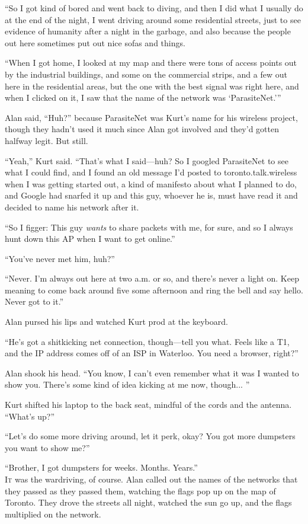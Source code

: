 ``So I got kind of bored and went back to diving, and then I did what
I usually do at the end of the night, I went driving around some
residential streets, just to see evidence of humanity after a night in
the garbage, and also because the people out here sometimes put out
nice sofas and things.

``When I got home, I looked at my map and there were tons of access
points out by the industrial buildings, and some on the commercial
strips, and a few out here in the residential areas, but the one with
the best signal was right here, and when I clicked on it, I saw that
the name of the network was `ParasiteNet.'''

Alan said, ``Huh?'' because ParasiteNet was Kurt's name for his
wireless project, though they hadn't used it much since Alan got
involved and they'd gotten halfway legit.  But still.

``Yeah,'' Kurt said.  ``That's what I said---huh?  So I googled
ParasiteNet to see what I could find, and I found an old message I'd
posted to toronto.talk.wireless when I was getting started out, a kind
of manifesto about what I planned to do, and Google had snarfed it up
and this guy, whoever he is, must have read it and decided to name his
network after it.

``So I figger:  This guy \textit{wants} to share packets with me, for
sure, and so I always hunt down this AP when I want to get online.''

``You've never met him, huh?''

``Never.  I'm always out here at two a.m.  or so, and there's never a
light on.  Keep meaning to come back around five some afternoon and
ring the bell and say hello.  Never got to it.''

Alan pursed his lips and watched Kurt prod at the keyboard.

``He's got a shitkicking net connection, though---tell you what. 
Feels like a T1, and the IP address comes off of an ISP in Waterloo. 
You need a browser, right?''

Alan shook his head.  ``You know, I can't even remember what it was I
wanted to show you.  There's some kind of idea kicking at me now,
though...  ''

Kurt shifted his laptop to the back seat, mindful of the cords and the
antenna.  ``What's up?''

``Let's do some more driving around, let it perk, okay?  You got more
dumpsters you want to show me?''

``Brother, I got dumpsters for weeks.  Months.  Years.''
\\
\lettrine[lines=3, lhang=.5, nindent=0pt, findent=2pt]{I}{t} was the wardriving, of course.  Alan called out the names of the
networks that they passed as they passed them, watching the flags pop
up on the map of Toronto.  They drove the streets all night, watched
the sun go up, and the flags multiplied on the network.

